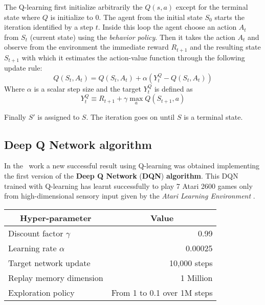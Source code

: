 The Q-learning first initialize arbitrarily the $Q(s,a)$ except for the terminal state where $Q$ is initialize to 0.
The agent from the initial state $S_0$ starts the iteration identified by a step $t$. Inside this loop the agent choose an action $A_t$ from $S_t$ (current state) using the \textit{behavior policy}. Then it takes the action $A_t$ and observe from the environment the immediate reward $R_{t+1}$ and the resulting state $S_{t+1}$ with which it estimates the action-value function through the following update rule:
\begin{equation}
	Q(S_t, A_t) = Q(S_t, A_t) + \alpha (Y^Q_t - Q(S_t, A_t))
\end{equation}
Where $\alpha$ is a scalar step size and the target $Y^Q_t$ is defined as
\begin{equation}
	Y^Q_t \equiv R_{t+1} + \gamma \max_{a} Q(S_{t+1}, a)
\end{equation}

Finally $S'$ is assigned to $S$. The iteration goes on until $S$ is a terminal state.

\subsection{Deep Q Network algorithm}
\label{subsec:DQN}

In the~\cite{DBLP:journals/corr/MnihKSGAWR13} work a new successful result using Q-learning was obtained implementing the first version of the \textbf{Deep Q Network} (\textbf{DQN}) \textbf{algorithm}. This DQN trained with Q-learning has learnt successfully to play 7 Atari 2600 games only from high-dimensional sensory input given by the \textit{Atari Learning Environment} \cite{ArcadeLearningEnvironment}.

\begin{table}[]
	\begin{tabular}{|l|r|}
		\hline
		\multicolumn{1}{|c|}{\textbf{Hyper-parameter}} &
		\multicolumn{1}{|c|}{\textbf{Value}}        \\
		\hline
		Discount factor $\gamma$ & 0.99                        \\
		Learning rate $\alpha$   & 0.00025                     \\
		Target network update    & 10,000 steps                \\
		Replay memory dimension  & 1 Million                   \\
		Exploration policy       & From 1 to 0.1 over 1M steps \\
		\hline
	\end{tabular}
\end{table}

